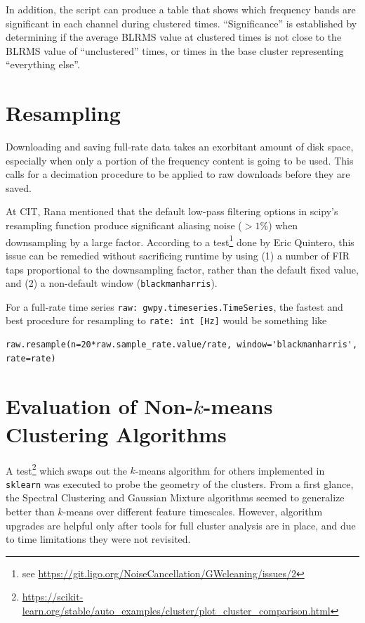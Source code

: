 \documentclass[colorlinks=true,pdfstartview=FitV,linkcolor=blue,
            citecolor=red,urlcolor=magenta]{ligodoc}
\begin{document}
In addition, the script can produce a table that shows which frequency bands are significant in each channel during clustered times.
``Significance'' is established by determining if the average BLRMS value at clustered times is not close to the BLRMS value of ``unclustered'' times, or times in the base cluster representing ``everything else''.


\appendix
\appendixpage
\section{Resampling}
Downloading and saving full-rate data takes an exorbitant amount of disk space, especially when only a portion of the frequency content is going to be used.
This calls for a decimation procedure to be applied to raw downloads before they are saved.

At CIT, Rana mentioned that the default low-pass filtering options in scipy's resampling function produce significant aliasing noise ($>1$\%) when downsampling by a large factor.
According to a test\footnote{see \url{https://git.ligo.org/NoiseCancellation/GWcleaning/issues/2}} done by Eric Quintero, this issue can be remedied without sacrificing runtime by using (1) a number of FIR taps proportional to the downsampling factor, rather than the default fixed value, and (2) a non-default window (\texttt{blackmanharris}).


For a full-rate time series \texttt{raw: gwpy.timeseries.TimeSeries}, the fastest and best procedure for resampling to \texttt{rate: int [Hz]} would be something like
\begin{verbatim}
raw.resample(n=20*raw.sample_rate.value/rate, window='blackmanharris', rate=rate)
\end{verbatim}

\section{Evaluation of Non-$k$-means Clustering Algorithms}
A test\footnote{\url{https://scikit-learn.org/stable/auto_examples/cluster/plot_cluster_comparison.html}} which swaps out the $k$-means algorithm for others implemented in \texttt{sklearn} was executed to probe the geometry of the clusters.
From a first glance, the Spectral Clustering and Gaussian Mixture algorithms seemed to generalize better than $k$-means over different feature timescales.
However, algorithm upgrades are helpful only after tools for full cluster analysis are in place, and due to time limitations they were not revisited.


\end{document}
